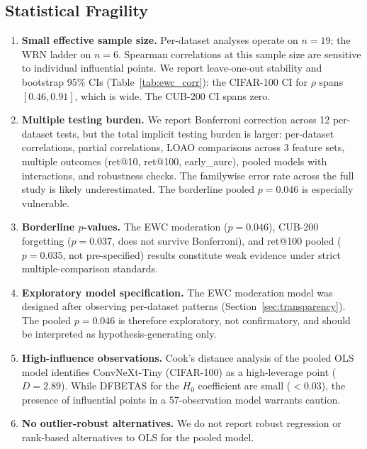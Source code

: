 \documentclass[10pt,twocolumn]{article}
\begin{document}
\subsection{Statistical Fragility}
\begin{enumerate}
    \item \textbf{Small effective sample size.} Per-dataset analyses operate on $n = 19$; the WRN ladder on $n = 6$. Spearman correlations at this sample size are sensitive to individual influential points. We report leave-one-out stability and bootstrap 95\% CIs (Table~\ref{tab:ewc_corr}): the CIFAR-100 CI for $\rho$ spans $[0.46, 0.91]$, which is wide. The CUB-200 CI spans zero.
    \item \textbf{Multiple testing burden.} We report Bonferroni correction across 12 per-dataset tests, but the total implicit testing burden is larger: per-dataset correlations, partial correlations, LOAO comparisons across 3 feature sets, multiple outcomes (ret@10, ret@100, early\_aurc), pooled models with interactions, and robustness checks. The familywise error rate across the full study is likely underestimated. The borderline pooled $p = 0.046$ is especially vulnerable.
    \item \textbf{Borderline $p$-values.} The EWC moderation ($p = 0.046$), CUB-200 forgetting ($p = 0.037$, does not survive Bonferroni), and ret@100 pooled ($p = 0.035$, not pre-specified) results constitute weak evidence under strict multiple-comparison standards.
    \item \textbf{Exploratory model specification.} The EWC moderation model was designed after observing per-dataset patterns (Section~\ref{sec:transparency}). The pooled $p = 0.046$ is therefore exploratory, not confirmatory, and should be interpreted as hypothesis-generating only.
    \item \textbf{High-influence observations.} Cook's distance analysis of the pooled OLS model identifies ConvNeXt-Tiny (CIFAR-100) as a high-leverage point ($D = 2.89$). While DFBETAS for the $H_0$ coefficient are small ($< 0.03$), the presence of influential points in a 57-observation model warrants caution.
    \item \textbf{No outlier-robust alternatives.} We do not report robust regression or rank-based alternatives to OLS for the pooled model.
\end{enumerate}
\end{document}
